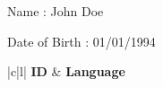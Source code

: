 \documentclass[a4paper,9pt,landscape]{article}
\begin{document}
\section*{}

\begin{center}
\item[Name :] John Doe
\item[Date of Birth :] 01/01/1994
\end{center}

\blindtext

\begin{table}[ht]
\centering
\renewcommand{\arraystretch}{2}
\begin{tabular}{|c|l|}
\hline
{}
\textbf{ID} & \textbf{Language} \\
\hline\renewcommand{\arraystretch}{1.5}



\end{tabular}
\caption{Language Summary}
\end{table}

\begin{center}

\end{center}
\end{document}
